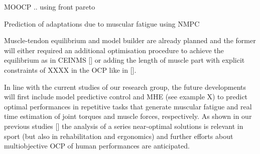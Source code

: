 MOOCP .. using front pareto

Prediction of adaptations due to muscular fatigue using NMPC

Muscle-tendon equilibrium and model builder are already planned and the former will either required an additional optimisation procedure to achieve the equilibrium as in CEINMS [\addref] or adding the length of muscle part with explicit constraints of XXXX in the OCP like in [\addref]. 

In line with the current studies of our research group, the future developments will first include  model predictive control and MHE (see example X) to predict optimal performances in repetitive tasks that generate muscular fatigue and real time estimation of joint torques and muscle forces, respectively. 
As shown in our previous studies [\addref] the analysis of a series near-optimal solutions is relevant in sport (but also in rehabilitation and ergonomics) and further efforts about multiobjective OCP of human performances are anticipated. 
